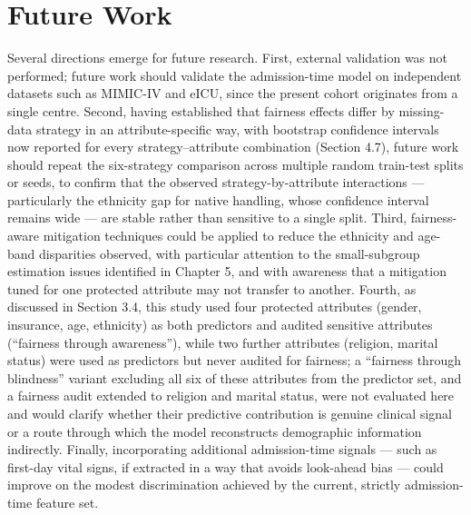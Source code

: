 \documentclass[12pt,a4paper]{report}
\begin{document}
\section{Future Work}
Several directions emerge for future research. First, external validation was not performed; future work should validate the admission-time model on independent datasets such as MIMIC-IV and eICU, since the present cohort originates from a single centre. Second, having established that fairness effects differ by missing-data strategy in an attribute-specific way, with bootstrap confidence intervals now reported for every strategy--attribute combination (Section 4.7), future work should repeat the six-strategy comparison across multiple random train-test splits or seeds, to confirm that the observed strategy-by-attribute interactions --- particularly the ethnicity gap for native handling, whose confidence interval remains wide --- are stable rather than sensitive to a single split. Third, fairness-aware mitigation techniques could be applied to reduce the ethnicity and age-band disparities observed, with particular attention to the small-subgroup estimation issues identified in Chapter 5, and with awareness that a mitigation tuned for one protected attribute may not transfer to another. Fourth, as discussed in Section 3.4, this study used four protected attributes (gender, insurance, age, ethnicity) as both predictors and audited sensitive attributes (``fairness through awareness''), while two further attributes (religion, marital status) were used as predictors but never audited for fairness; a ``fairness through blindness'' variant excluding all six of these attributes from the predictor set, and a fairness audit extended to religion and marital status, were not evaluated here and would clarify whether their predictive contribution is genuine clinical signal or a route through which the model reconstructs demographic information indirectly. Finally, incorporating additional admission-time signals --- such as first-day vital signs, if extracted in a way that avoids look-ahead bias --- could improve on the modest discrimination achieved by the current, strictly admission-time feature set.
\end{document}
